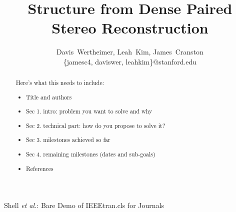 \documentclass[journal]{IEEEtran}
\begin{document}
%
\title{Structure from Dense Paired Stereo Reconstruction}
\author{Davis~Wertheimer, Leah~Kim, James~Cranston \\[4px]
\{jamesc4, daviswer, leahkim\}@stanford.edu}

%
{Shell \MakeLowercase{\textit{et al.}}: Bare Demo of IEEEtran.cls for Journals}
\maketitle

\begin{abstract}
  Here's what this needs to include:
  \begin{itemize}
    \item Title and authors
    \item Sec 1. intro: problem you want to solve and why
    \item Sec 2. technical part: how do you propose to solve it?
    \item Sec 3. milestones achieved so far
    \item Sec 4. remaining milestones (dates and sub-goals)
    \item References
  \end{itemize}  
\end{abstract}

\IEEEpeerreviewmaketitle
\end{document}
